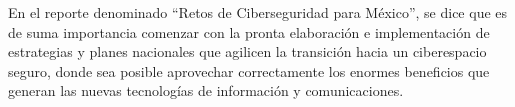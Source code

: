 \documentclass[runningheads,a4paper]{llncs}
\begin{document}
En el reporte denominado ``Retos de Ciberseguridad para México'', se dice que es de suma importancia comenzar con la pronta elaboración e implementación de estrategias y planes nacionales que agilicen la transición hacia un ciberespacio seguro, donde sea posible aprovechar correctamente los enormes beneficios que generan las nuevas tecnologías de información y comunicaciones.\\



\printnoidxglossaries     
         


\end{document}
